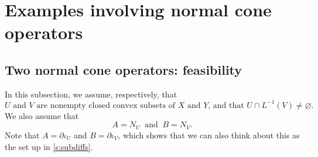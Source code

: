 \documentclass{article}
\begin{document}
\section{Examples involving normal cone operators}

\label{s:normalcones}



\subsection{Two normal cone operators: feasibility}

In this subsection, we assume, respectively,  that 
\begin{equation}
\label{e:feas1}
\text{$U$ and $V$ are nonempty closed convex subsets of $X$ and $Y$, and that 
$U \cap L^{-1}(V) \neq\varnothing$.}
\end{equation}
We also assume that 
\begin{equation}
\label{e:feas2}
A = N_U \;\;\text{and}\;\; B = N_V.
\end{equation}
Note that $A = \partial\iota_U$ and $B=\partial\iota_V$, 
which shows that we can also think about this as the set up in 
\cref{s:subdiffs}. 
\end{document}

